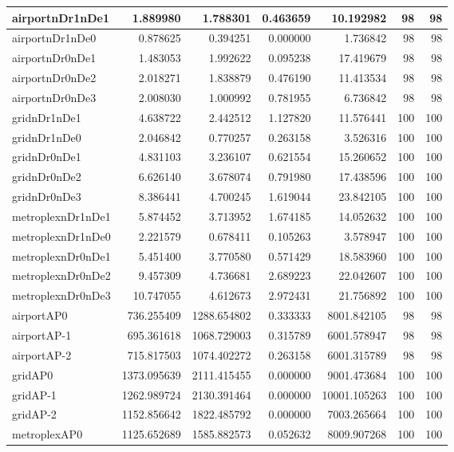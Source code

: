 \begin{longtable}{|l|r|r|r|r|r|r|}
\endlastfoot
airportnDr1nDe1 & 1.889980 & 1.788301 & 0.463659 & 10.192982 & 98 & 98 \\ \hline
airportnDr1nDe0 & 0.878625 & 0.394251 & 0.000000 & 1.736842 & 98 & 98 \\ \hline
airportnDr0nDe1 & 1.483053 & 1.992622 & 0.095238 & 17.419679 & 98 & 98 \\ \hline
airportnDr0nDe2 & 2.018271 & 1.838879 & 0.476190 & 11.413534 & 98 & 98 \\ \hline
airportnDr0nDe3 & 2.008030 & 1.000992 & 0.781955 & 6.736842 & 98 & 98 \\ \hline
gridnDr1nDe1 & 4.638722 & 2.442512 & 1.127820 & 11.576441 & 100 & 100 \\ \hline
gridnDr1nDe0 & 2.046842 & 0.770257 & 0.263158 & 3.526316 & 100 & 100 \\ \hline
gridnDr0nDe1 & 4.831103 & 3.236107 & 0.621554 & 15.260652 & 100 & 100 \\ \hline
gridnDr0nDe2 & 6.626140 & 3.678074 & 0.791980 & 17.438596 & 100 & 100 \\ \hline
gridnDr0nDe3 & 8.386441 & 4.700245 & 1.619044 & 23.842105 & 100 & 100 \\ \hline
metroplexnDr1nDe1 & 5.874452 & 3.713952 & 1.674185 & 14.052632 & 100 & 100 \\ \hline
metroplexnDr1nDe0 & 2.221579 & 0.678411 & 0.105263 & 3.578947 & 100 & 100 \\ \hline
metroplexnDr0nDe1 & 5.451400 & 3.770580 & 0.571429 & 18.583960 & 100 & 100 \\ \hline
metroplexnDr0nDe2 & 9.457309 & 4.736681 & 2.689223 & 22.042607 & 100 & 100 \\ \hline
metroplexnDr0nDe3 & 10.747055 & 4.612673 & 2.972431 & 21.756892 & 100 & 100 \\ \hline
airportAP0 & 736.255409 & 1288.654802 & 0.333333 & 8001.842105 & 98 & 98 \\ \hline
airportAP-1 & 695.361618 & 1068.729003 & 0.315789 & 6001.578947 & 98 & 98 \\ \hline
airportAP-2 & 715.817503 & 1074.402272 & 0.263158 & 6001.315789 & 98 & 98 \\ \hline
gridAP0 & 1373.095639 & 2111.415455 & 0.000000 & 9001.473684 & 100 & 100 \\ \hline
gridAP-1 & 1262.989724 & 2130.391464 & 0.000000 & 10001.105263 & 100 & 100 \\ \hline
gridAP-2 & 1152.856642 & 1822.485792 & 0.000000 & 7003.265664 & 100 & 100 \\ \hline
metroplexAP0 & 1125.652689 & 1585.882573 & 0.052632 & 8009.907268 & 100 & 100 \\ \hline

\end{longtable}
